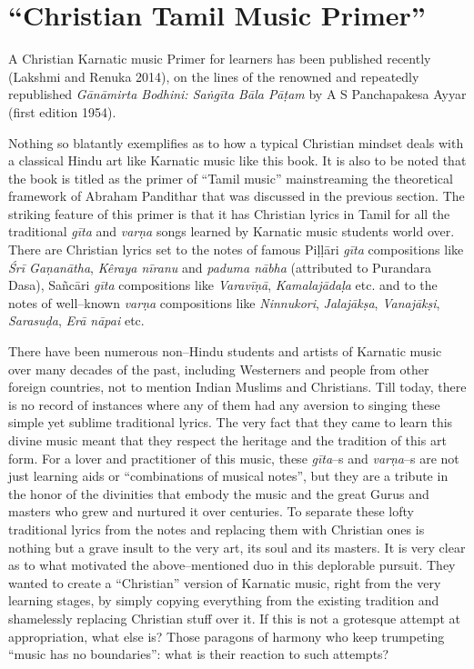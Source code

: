 \section*{“Christian Tamil Music Primer”}

A Christian Karnatic music Primer for learners has been published recently (Lakshmi and Renuka 2014), on the lines of the renowned and repeatedly republished \textit{Gānāmirta Bodhini: Saṅgīta Bāla Pāṭam} by A S Panchapakesa Ayyar (first edition 1954).

Nothing so blatantly exemplifies as to how a typical Christian mindset deals with a classical Hindu art like Karnatic music like this book. It is also to be noted that the book is titled as the primer of “Tamil music” mainstreaming the theoretical framework of Abraham Pandithar that was discussed in the previous section. The striking feature of this primer is that it has Christian lyrics in Tamil for all the traditional \textit{gīta} and \textit{varṇa} songs learned by Karnatic music students world over. There are Christian lyrics set to the notes of famous Piḷḷāri \textit{gīta} compositions like \textit{Śrī Gaṇanātha}, \textit{Kêraya nīranu} and \textit{paduma nābha }(attributed to Purandara Dasa), Sañcāri \textit{gīta} compositions like \textit{Varavīṇā}, \textit{Kamalajādaḷa} etc. and to the notes of well–known \textit{varṇa} compositions like \textit{Ninnukori}, \textit{Jalajākṣa}, \textit{Vanajākṣi}, \textit{Sarasuḍa}, \textit{Erā nāpai} etc.

There have been numerous non–Hindu students and artists of Karnatic music over many decades of the past, including Westerners and people from other foreign countries, not to mention Indian Muslims and Christians. Till today, there is no record of instances where any of them had any aversion to singing these simple yet sublime traditional lyrics. The very fact that they came to learn this divine music meant that they respect the heritage and the tradition of this art form. For a lover and practitioner of this music, these \textit{gīta}–s and \textit{varṇa}–s are not just learning aids or “combinations of musical notes”, but they are a tribute in the honor of the divinities that embody the music and the great Gurus and masters who grew and nurtured it over centuries. To separate these lofty traditional lyrics from the notes and replacing them with Christian ones is nothing but a grave insult to the very art, its soul and its masters. It is very clear as to what motivated the above–mentioned duo in this deplorable pursuit. They wanted to create a “Christian” version of Karnatic music, right from the very learning stages, by simply copying everything from the existing tradition and shamelessly replacing Christian stuff over it. If this is not a grotesque attempt at appropriation, what else is? Those paragons of harmony who keep trumpeting “music has no boundaries”: what is their reaction to such attempts?


